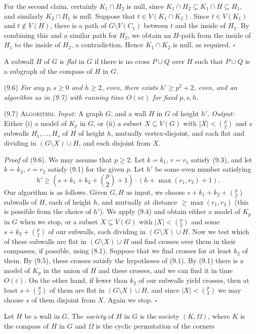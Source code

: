 For the second claim, certainly $K_1 \cap H_2$ is null, since $K_1 \cap H_2 \subseteq K_1 \cap H \subseteq H_1$, and similarly $K_2 \cap H_1$ is null. Suppose that $t \in V(K_1 \cap K_2)$. Since $t \in V(K_1)$ and $t \notin V(H)$, there is a path of $G \setminus V(C_1)$ between $t$ and the inside of $H_1$. By combining this and a similar path for $H_2$, we obtain an $H$-path from the inside of $H_1$ to the inside of $H_2$, a contradiction. Hence $K_1 \cap K_2$ is null, as required. $\square$

A subwall $H$ of $G$ is \textit{flat} in $G$ if there is no cross $P \cup Q$ over $H$ such that $P \cup Q$ is a subgraph of the compass of $H$ in $G$.

\stmt
(9.6) \textit{For any $p, s \ge 0$ and $h \ge 2$, even, there exists $h' \ge p^2 + 2$, even, and an algorithm as in (9.7) with running time $O(v\varepsilon)$ for fixed $p, s, h$.}

\stmt
(9.7) \textsc{Algorithm}. \textit{Input:} A graph $G$, and a wall $H$ in $G$ of height $h'$. \textit{Output:} Either (i) a model of $K_p$ in $G$, or (ii) a subset $X \subseteq V(G)$ with $|X| < \binom{p}{2}$ and $s$ subwalls $H_1, \dots, H_s$ of $H$ of height $h$, mutually vertex-disjoint, and each flat and dividing in $(G \setminus X) \cup H$, and each disjoint from $X$.

\textit{Proof} of (9.6). We may assume that $p \ge 2$. Let $k = k_1$, $r = r_1$ satisfy (9.3), and let $k = k_2$, $r = r_2$ satisfy (9.1) for the given $p$. Let $h'$ be some even number satisfying
\begin{equation*}
h' \ge \left(s + k_1 + k_2 + \binom{p}{2} + 1\right) \cdot (h + \max(r_1, r_2) + 1).
\end{equation*}
Our algorithm is as follows. Given $G, H$ as input, we choose $s + k_1 + k_2 + \binom{p}{2}$ subwalls of $H$, each of height $h$, and mutually at distance $\ge \max(r_1, r_2)$ (this is possible from the choice of $h'$). We apply (9.4) and obtain either a model of $K_p$ in $G$ when we stop, or a subset $X \subseteq V(G)$ with $|X| < \binom{p}{2}$ and some $s + k_2 + \binom{p}{2}$ of our subwalls, each dividing in $(G \setminus X) \cup H$. Now we test which of these subwalls are flat in $(G \setminus X) \cup H$ and find crosses over them in their compasses, if possible, using (8.1). Suppose that we find crosses for at least $k_2$ of them. By (9.5), these crosses satisfy the hypotheses of (9.1). By (9.1) there is a model of $K_p$ in the union of $H$ and these crosses, and we can find it in time $O(\varepsilon)$. On the other hand, if fewer than $k_2$ of our subwalls yield crosses, then at least $s + \binom{p}{2}$ of them are flat in $(G \setminus X) \cup H$, and since $|X| < \binom{p}{2}$ we may choose $s$ of them disjoint from $X$. Again we stop. $\square$

Let $H$ be a wall in $G$. The \textit{society} of $H$ in $G$ is the society $(K, \Omega)$, where $K$ is the compass of $H$ in $G$ and $\Omega$ is the cyclic permutation of the corners
